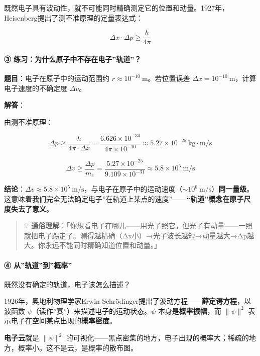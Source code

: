 \documentclass[a4paper,11pt]{ctexart}
\begin{document}
既然电子具有波动性，就不可能同时精确测定它的位置和动量。1927年，Heisenberg提出了测不准原理的定量表达式：

\[
\boxed{\Delta x \cdot \Delta p \geq \frac{h}{4\pi}}
\]

\paragraph{③ 练习：为什么原子中不存在电子''轨道''？}\label{ux7ec3ux4e60ux4e3aux4ec0ux4e48ux539fux5b50ux4e2dux4e0dux5b58ux5728ux7535ux5b50ux8f68ux9053}

\textbf{题目}：电子在原子中的运动范围约 \(r \approx 10^{-10}\ \mathrm{m}\)。若位置误差 \(\Delta x = 10^{-10}\ \mathrm{m}\)，计算电子速度的不确定度 \(\Delta v\)。

\textbf{解答}：

由测不准原理：

\[\Delta p \geq \frac{h}{4\pi \cdot \Delta x} = \frac{6.626\times 10^{-34}}{4\pi \times 10^{-10}} \approx 5.27\times 10^{-25}\ \mathrm{kg\cdot m/s}\]

\[\Delta v \geq \frac{\Delta p}{m_e} = \frac{5.27\times 10^{-25}}{9.109\times 10^{-31}} \approx 5.8\times 10^5\ \mathrm{m/s}\]

\textbf{结论}：\(\Delta v \approx 5.8\times 10^5\ \mathrm{m/s}\)，与电子在原子中的运动速度（\(\sim 10^6\ \mathrm{m/s}\)）\textbf{同一量级}。这意味着我们完全无法确定电子''在轨道上某点的速度''------\textbf{``轨道''概念在原子尺度失去了意义}。

\begin{quote}
💡 \textbf{通俗理解}：「你想看电子在哪儿------用光子照它。但光子有动量------一照就把电子踢走了。测得越精确（Δx小）→光子波长越短→动量越大→Δp越大。你永远不能同时精确知道位置和动量。」
\end{quote}

\paragraph{④ 从''轨道''到''概率''}\label{ux4eceux8f68ux9053ux5230ux6982ux7387}

既然没有确定的轨道，电子该怎么描述？

1926年，奥地利物理学家Erwin Schrödinger提出了波动方程------\textbf{薛定谔方程}，以波函数 \(\psi\)（读作''赛''）来描述电子的运动状态。\(\psi\) 本身是\textbf{概率振幅}，而 \(\|\psi\|^2\) 表示电子在空间某点出现的\textbf{概率密度}。

\textbf{电子云}就是 \(\|\psi\|^2\) 的可视化------黑点密集的地方，电子出现的概率大；稀疏的地方，概率小。这不是云，是概率的散布图。
\end{document}
